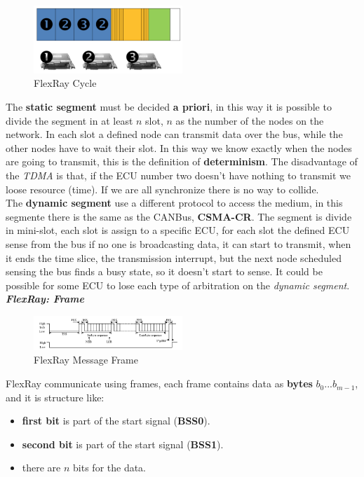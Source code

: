 \begin{figure}[h]
    \centering
    \label{fig:flexray_tdma}
    \includegraphics[width=0.5\textwidth]{img/flexray_tdma}
    \caption{FlexRay Cycle}
\end{figure}
The \textbf{static segment} must be decided \textbf{a priori}, in this way it is possible to divide the segment in at least $n$ slot, $n$ as the number of the nodes on the network. In each slot a defined node can transmit data over the bus, while the other nodes have to wait their slot. In this way we know exactly when the nodes are going to transmit, this is the definition of \textbf{determinism}. The disadvantage of the \textit{TDMA} is that, if the ECU number two doesn't have nothing to transmit we loose resource (time). If we are all synchronize there is no way to collide. \\
The \textbf{dynamic segment} use a different protocol to access the medium, in this segmente there is the same as the CANBus, \textbf{CSMA-CR}. The segment is divide in mini-slot, each slot is assign to a specific ECU, for each slot the defined ECU sense from the bus if no one is broadcasting data, it can start to transmit, when it ends the time slice, the transmission interrupt, but the next node scheduled sensing the bus finds a busy state, so it doesn't start to sense. It could be possible for some ECU to lose each type of arbitration on the \textit{dynamic segment}. \\ \newline
\textbf{\textit{FlexRay: Frame}} \\
\begin{figure}[h]
    \centering
    \includegraphics[width=0.5\textwidth]{img/flexray_frame}
    \caption{FlexRay Message Frame}
\end{figure}
FlexRay communicate using frames, each frame contains data as \textbf{bytes} $b_0... b_{m-1}$, and it is structure like:
\begin{itemize}[nosep]
    \item \textbf{first bit} is part of the start signal (\textbf{BSS0}).
    \item \textbf{second bit} is part of the start signal (\textbf{BSS1}).
    \item there are $n$ bits for the data.
\end{itemize}
